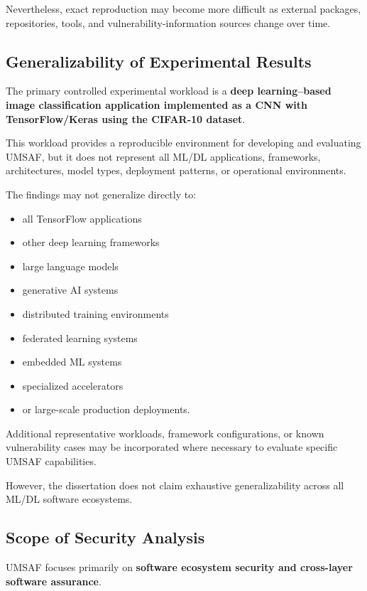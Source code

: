 \documentclass[
  12pt,
  letterpaper,
  oneside]{report}
\providecommand{\tightlist}{%
  \setlength{\itemsep}{0pt}\setlength{\parskip}{0pt}}
\begin{document}
Nevertheless, exact reproduction may become more difficult as external
packages, repositories, tools, and vulnerability-information sources
change over time.

\subsection{Generalizability of Experimental Results}\label{13111-generalizability-of-experimental-results}

The primary controlled experimental workload is a \textbf{deep
learning--based image classification application implemented as a CNN
with TensorFlow/Keras using the CIFAR-10 dataset}.

This workload provides a reproducible environment for developing and
evaluating UMSAF, but it does not represent all ML/DL applications,
frameworks, architectures, model types, deployment patterns, or
operational environments.

The findings may not generalize directly to:

\begin{itemize}
\tightlist
\item
  all TensorFlow applications
\item
  other deep learning frameworks
\item
  large language models
\item
  generative AI systems
\item
  distributed training environments
\item
  federated learning systems
\item
  embedded ML systems
\item
  specialized accelerators
\item
  or large-scale production deployments.
\end{itemize}

Additional representative workloads, framework configurations, or known
vulnerability cases may be incorporated where necessary to evaluate
specific UMSAF capabilities.

However, the dissertation does not claim exhaustive generalizability
across all ML/DL software ecosystems.

\subsection{Scope of Security Analysis}\label{13112-scope-of-security-analysis}

UMSAF focuses primarily on \textbf{software ecosystem security and
cross-layer software assurance}.
\end{document}
